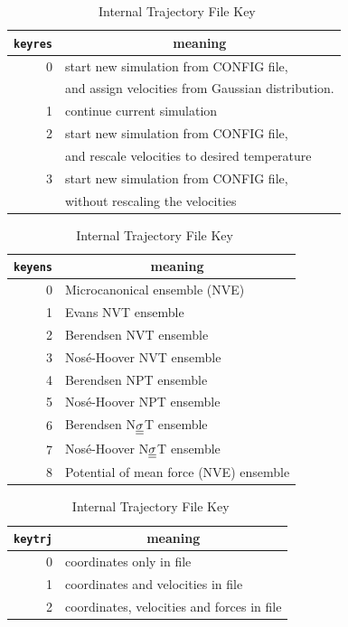 \begin{table}[ht]
 \caption{\label{KEYRES}\ Internal Restart Key}
\vskip 5pt
 \begin{centering} \begin{tabular}{|r|l|}
\hline
{\tt keyres} & \multicolumn{1}{c|}{meaning} \\
\hline
0 & start new simulation from CONFIG file,\\
  &  and assign velocities from Gaussian distribution. \\
1 & continue current simulation\\
2 & start new simulation from CONFIG file,\\
  & and rescale velocities to desired temperature\\
3 & start new simulation from CONFIG file,\\
  & without rescaling the  velocities\\
\hline
\end{tabular}
\vskip 5mm

 \caption{\label{KEYENS}\ Internal  Ensemble  Key}
\vskip 5pt
 \begin{tabular}{|r|l|}
\hline
{\tt keyens} & \multicolumn{1}{c|}{meaning} \\
\hline
0 & Microcanonical ensemble\index{ensemble!microcanonical|see{ensemble,NVE}} (NVE) \index{ensemble!NVE}\\
1 & Evans NVT\index{ensemble!Evans NVT} ensemble \\
2 & Berendsen NVT ensemble\index{ensemble!Berendsen NVT} \\
3 & Nos\'{e}-Hoover NVT ensemble\\
4 & Berendsen NPT ensemble\index{ensemble!Berendsen NPT}\\
5 & Nos\'{e}-Hoover NPT ensemble\\
6 & Berendsen N$\mbox{$\underline{\underline{\bf \sigma}}$}$T ensemble\index{ensemble!Berendsen N$\sigma$T}\\
7 & Nos\'{e}-Hoover N$\mbox{$\underline{\underline{\bf \sigma}}$}$T ensemble\\
8 & Potential of mean force (NVE) ensemble\index{ensemble!NVE}\\
\hline
\end{tabular}
\vskip 5mm

 \caption{\label{KEYTRJ}\ Internal Trajectory File  Key}
\vskip 5pt
 \begin{tabular}{|r|l|}
\hline
{\tt keytrj} & \multicolumn{1}{c|}{meaning} \\
\hline
0 & coordinates only in file\\
1 & coordinates and velocities in file\\
2 & coordinates, velocities and forces in file \\
\hline
\end{tabular}

\end{centering}

\end{table}

